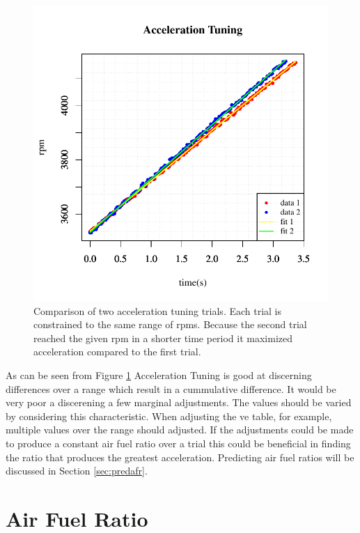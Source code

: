 \documentclass{article}
\begin{document}
\begin{figure}[!htbp]
\center
\includegraphics[scale=0.8]{msq-accel-4g_52cm_45-65mph-20110627-20:17:43-rtdata-single}
\caption{Comparison of two acceleration tuning trials.
Each trial is constrained to the same range of rpms.
Because the second trial reached the given rpm in a shorter time
period it maximized acceleration compared to the first trial.}
\label{fig:acctun}
\end{figure}

As can be seen from Figure \ref{fig:acctun} Acceleration Tuning is good
at discerning differences over a range which result in a cummulative
difference.
It would be very poor a discerening a few marginal adjustments.
The values should be varied by considering this characteristic.
When adjusting the ve table, for example, multiple values over the
range should adjusted.
If the adjustments could be made to produce a constant air fuel ratio
over a trial this could be beneficial in finding the ratio that produces
the greatest acceleration.
Predicting air fuel ratios will be discussed in Section \ref{sec:predafr}.

\section{Air Fuel Ratio}
\label{sec:afr}
\end{document}

